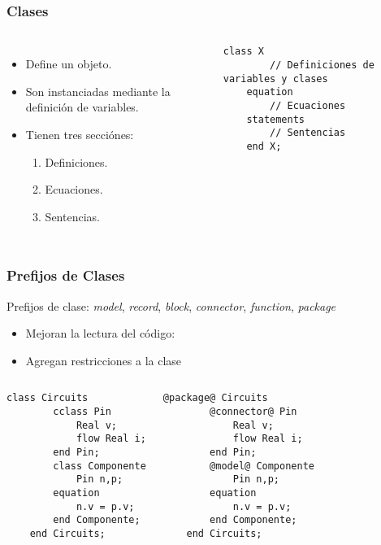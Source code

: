 \documentclass[aspectratio=169,10pt]{beamer}
\begin{document}
\begin{frame}[fragile]
\frametitle{Clases} 
\begin{columns}  
\begin{itemize}
    \item Define un objeto.
    \item Son instanciadas mediante la definici\'on de variables.
    \item Tienen tres secci\'ones:
        \begin{enumerate}
            \item Definiciones.
            \item Ecuaciones.
            \item Sentencias.
        \end{enumerate}
\end{itemize}

\begin{lstlisting}[style=base]
    class X
        // Definiciones de variables y clases   
    equation
        // Ecuaciones
    statements
        // Sentencias
    end X;   
\end{lstlisting}
\end{columns}
\end{frame}

\begin{frame}[fragile]
\frametitle{Prefijos de Clases} 
Prefijos de clase: \textit{model}, \textit{record}, \textit{block}, \textit{connector}, \textit{function}, \textit{package}
\begin{itemize}
    \item Mejoran la lectura del c\'odigo:
    \item Agregan restricciones a la clase
\end{itemize}   

\begin{columns}  
\begin{lstlisting}[style=base]
    class Circuits
        cclass Pin
            Real v;
            flow Real i;
        end Pin;
        class Componente
            Pin n,p;
        equation 
            n.v = p.v;
        end Componente; 
    end Circuits;   
\end{lstlisting}
\par

\begin{lstlisting}[style=base]
    @package@ Circuits
        @connector@ Pin
            Real v;
            flow Real i;
        end Pin;
        @model@ Componente
            Pin n,p;
        equation 
            n.v = p.v;
        end Componente; 
    end Circuits;   
\end{lstlisting}
\par
\end{columns}
\end{frame}
\end{document}
